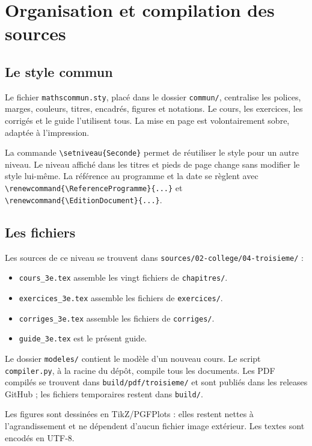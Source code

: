 \documentclass[11pt,a4paper,oneside]{book}
\begin{document}
\chapter{Organisation et compilation des sources}
\section{Le style commun}
Le fichier \texttt{mathscommun.sty}, placé dans le dossier \texttt{commun/}, centralise les polices, marges, couleurs, titres, encadrés, figures et notations. Le cours, les exercices, les corrigés et le guide l'utilisent tous. La mise en page est volontairement sobre, adaptée à l'impression.

La commande \verb|\setniveau{Seconde}| permet de réutiliser le style pour un autre niveau. Le niveau affiché dans les titres et pieds de page change sans modifier le style lui-même. La référence au programme et la date se règlent avec \verb|\renewcommand{\ReferenceProgramme}{...}| et \verb|\renewcommand{\EditionDocument}{...}|.
\section{Les fichiers}
Les sources de ce niveau se trouvent dans \texttt{sources/02-college/04-troisieme/} :
\begin{itemize}
\item \texttt{cours\_3e.tex} assemble les vingt fichiers de \texttt{chapitres/}.
\item \texttt{exercices\_3e.tex} assemble les fichiers de \texttt{exercices/}.
\item \texttt{corriges\_3e.tex} assemble les fichiers de \texttt{corriges/}.
\item \texttt{guide\_3e.tex} est le présent guide.
\end{itemize}
Le dossier \texttt{modeles/} contient le modèle d'un nouveau cours. Le script \texttt{compiler.py}, à la racine du dépôt, compile tous les documents. Les PDF compilés se trouvent dans \texttt{build/pdf/troisieme/} et sont publiés dans les releases GitHub ; les fichiers temporaires restent dans \texttt{build/}.

Les figures sont dessinées en TikZ/PGFPlots : elles restent nettes à l'agrandissement et ne dépendent d'aucun fichier image extérieur. Les textes sont encodés en UTF-8.
\clearpage
\end{document}
